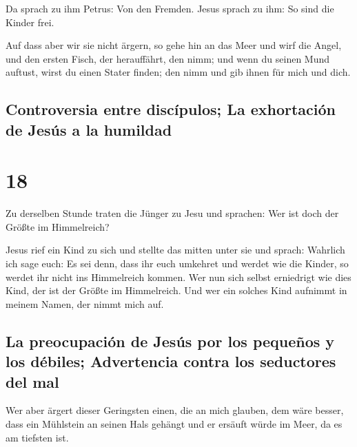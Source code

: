  Da sprach zu ihm Petrus: Von den Fremden. Jesus sprach
zu ihm: So sind die Kinder frei.

 Auf dass aber wir sie nicht ärgern, so gehe hin an das
Meer und wirf die Angel, und den ersten Fisch, der herauffährt, den
nimm; und wenn du seinen Mund auftust, wirst du einen Stater finden; den
nimm und gib ihnen für mich und dich.

\hypertarget{controversia-entre-discuxedpulos-la-exhortaciuxf3n-de-jesuxfas-a-la-humildad}{%
\subsection{Controversia entre discípulos; La exhortación de Jesús a la
humildad}\label{controversia-entre-discuxedpulos-la-exhortaciuxf3n-de-jesuxfas-a-la-humildad}}

\hypertarget{section-17}{%
\section{18}\label{section-17}}

 Zu derselben Stunde traten die Jünger zu Jesu und
sprachen: Wer ist doch der Größte im Himmelreich?

 Jesus rief ein Kind zu sich und stellte das mitten unter
sie  und sprach: Wahrlich ich sage euch: Es sei denn, dass
ihr euch umkehret und werdet wie die Kinder, so werdet ihr nicht ins
Himmelreich kommen.  Wer nun sich selbst erniedrigt wie
dies Kind, der ist der Größte im Himmelreich.  Und wer ein
solches Kind aufnimmt in meinem Namen, der nimmt mich auf.

\hypertarget{la-preocupaciuxf3n-de-jesuxfas-por-los-pequeuxf1os-y-los-duxe9biles-advertencia-contra-los-seductores-del-mal}{%
\subsection{La preocupación de Jesús por los pequeños y los débiles;
Advertencia contra los seductores del
mal}\label{la-preocupaciuxf3n-de-jesuxfas-por-los-pequeuxf1os-y-los-duxe9biles-advertencia-contra-los-seductores-del-mal}}

 Wer aber ärgert dieser Geringsten einen, die an mich
glauben, dem wäre besser, dass ein Mühlstein an seinen Hals gehängt und
er ersäuft würde im Meer, da es am tiefsten ist.

